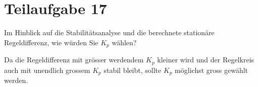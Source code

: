 \section{Teilaufgabe 17}
\begin{aufgabe}
    Im Hinblick auf die Stabilitätsanalyse und die berechnete stationäre 
    Regeldifferenz, wie würden Sie $K_p$ wählen?
\end{aufgabe}
Da die Regeldifferenz mit grösser werdendem $K_p$ kleiner wird und der 
Regelkreis auch mit unendlich grossem $K_p$ stabil bleibt, sollte $K_p$ 
möglichst gross gewählt werden. 
